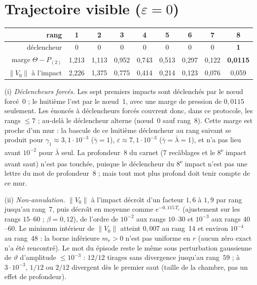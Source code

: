 \documentclass[11pt,a4paper]{article}
\theoremstyle{remark}
\newcommand{\norm}[1]{\lVert #1\rVert}
\newcommand{\vth}{\vartheta}
\begin{document}
\section{Trajectoire visible ($\varepsilon=0$)}
\begin{center}\small
\begin{tabular}{r|cccccccc}
\toprule
rang & 1 & 2 & 3 & 4 & 5 & 6 & 7 & 8\\
\midrule
d\'eclencheur & 0&0&0&0&0&0&0&\textbf{1}\\
marge $\Theta-P_{(2)}$ & 1,213 & 1,113 & 0,952 & 0,743 & 0,513 & 0,297 & 0,122 & \textbf{0,0115}\\
$\norm{V_0}$ \`a l'impact & 2,226 & 1,375 & 0,775 & 0,414 & 0,214 & 0,123 & 0,076 & 0,059\\
\bottomrule
\end{tabular}
\end{center}
(i) \emph{D\'eclencheurs forc\'es.} Les sept premiers impacts sont d\'eclench\'es par le n\oe ud forc\'e~0 ; le huiti\`eme l'est par le n\oe ud~1, avec une marge de pression de $0{,}0115$ seulement. Les \'enonc\'es \`a \og d\'eclencheurs forc\'es \fg{} couvrent donc, dans ce protocole, les rangs $\le7$ ; au-del\`a le d\'eclencheur alterne (n\oe ud~0 sauf rang~8). Cette marge est proche d'un mur : la bascule de ce huiti\`eme d\'eclencheur au rang suivant se produit pour $\gamma_1\approx3{,}1\cdot10^{-3}$ ($\bar\gamma=1$), $\varepsilon\approx7{,}1\cdot10^{-3}$ ($\bar\gamma=\bar\lambda=1$), et n'a pas lieu avant $10^{-2}$ pour $\bar\lambda$ seul. La profondeur~8 du carnet (7 recâblages et le 8\textsuperscript{e} impact avant saut) n'est pas touch\'ee, puisque le d\'eclencheur du 8\textsuperscript{e} impact n'est pas une lettre du mot de profondeur~8 ; mais tout mot plus profond doit tenir compte de ce mur.

(ii) \emph{Non-annulation.} $\norm{V_0}$ \`a l'impact d\'ecro\^{\i}t d'un facteur $1{,}6$ \`a $1{,}9$ par rang jusqu'au rang~7, puis d\'ecro\^{\i}t en moyenne comme $e^{-0{,}115\,T_r}$ (ajustement sur les rangs $15$--$60$ ; $\beta=0{,}12$), de l'ordre de $10^{-2}$ aux rangs $10$--$30$ et $10^{-3}$ aux rangs $40$--$60$. Le minimum int\'erieur de $\norm{V_0}$ atteint $0{,}007$ au rang~14 et environ $10^{-4}$ au rang~48 : la borne inf\'erieure $m_r>0$ n'est pas uniforme en $r$ (aucun z\'ero exact n'a \'et\'e rencontr\'e). Le mot du \'episode reste le m\^eme sous perturbation gaussienne de $\vth$ d'amplitude $\le10^{-3}$ : $12/12$ tirages sans divergence jusqu'au rang~$59$ ; \`a $3\cdot10^{-3}$, $1/12$ ou $2/12$ divergent d\`es le premier saut (taille de la chambre, pas un effet de profondeur).
\end{document}

